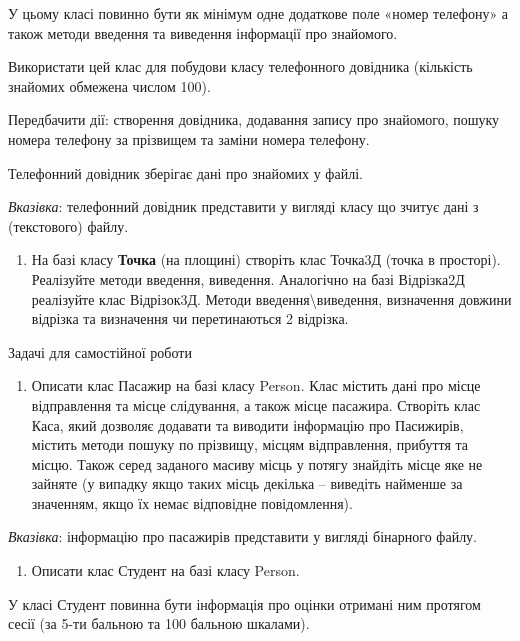 \documentclass[]{article}
\begin{document}
У цьому класі повинно бути як мінімум одне додаткове поле «номер
телефону» а також методи введення та виведення інформації про знайомого.

Використати цей клас для побудови класу телефонного довідника (кількість
знайомих обмежена числом 100).

Передбачити дії: створення довідника, додавання запису про знайомого,
пошуку номера телефону за прізвищем та заміни номера телефону.

Телефонний довідник зберігає дані про знайомих у файлі.

\emph{\emph{Вказівка}}: телефонний довідник представити у вигляді класу
що зчитує дані з (текстового) файлу.

\begin{enumerate}
\def\labelenumi{\arabic{enumi})}
\item
  На базі класу \textbf{Точка} (на площині) створіть клас Точка3Д (точка
  в просторі). Реалізуйте методи введення, виведення. Аналогічно на базі
  Відрізка2Д реалізуйте клас Відрізок3Д. Методи
  введення\textbackslash{}виведення, визначення довжини відрізка та
  визначення чи перетинаються 2 відрізка.
\end{enumerate}

Задачі для самостійної роботи

\begin{enumerate}
\def\labelenumi{\arabic{enumi})}
\item
  Описати клас Пасажир на базі класу Person. Клас містить дані про місце
  відправлення та місце слідування, а також місце пасажира. Створіть
  клас Каса, який дозволяє додавати та виводити інформацію про
  Пасижирів, містить методи пошуку по прізвищу, місцям відправлення,
  прибуття та місцю. Також серед заданого масиву місць у потягу знайдіть
  місце яке не зайняте (у випадку якщо таких місць декілька -- виведіть
  найменше за значенням, якщо їх немає відповідне повідомлення).
\end{enumerate}

\emph{\emph{Вказівка}}: інформацію про пасажирів представити у вигляді
бінарного файлу.

\begin{enumerate}
\def\labelenumi{\arabic{enumi})}
\item
  Описати клас Студент на базі класу Person.
\end{enumerate}

У класі Студент повинна бути інформація про оцінки отримані ним протягом
сесії (за 5-ти бальною та 100 бальною шкалами).
\end{document}
